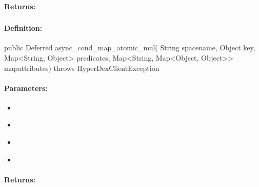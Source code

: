 \paragraph{Returns:}


\pagebreak
\subsubsection{}
\label{api:java:async_cond_map_atomic_mul}


\paragraph{Definition:}
\begin{javacode}
public Deferred async_cond_map_atomic_mul(
        String spacename,
        Object key,
        Map<String, Object> predicates,
        Map<String, Map<Object, Object>> mapattributes) throws HyperDexClientException
\end{javacode}

\paragraph{Parameters:}
\begin{itemize}[noitemsep]
\item {}\\

\item {}\\

\item {}\\

\item {}\\

\end{itemize}

\paragraph{Returns:}



